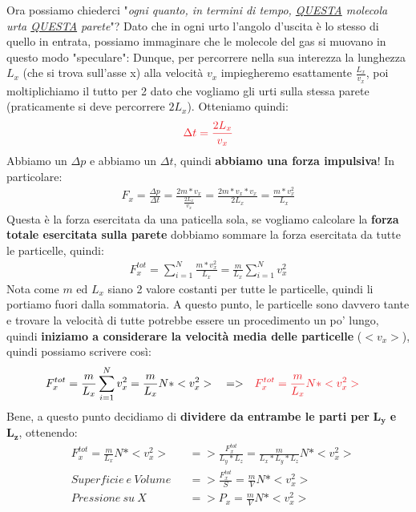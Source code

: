                     Ora possiamo chiederci "\textit{ogni quanto, in termini di tempo, \underline{QUESTA} molecola urta \underline{QUESTA} parete}"? Dato che in ogni urto l'angolo d'uscita è lo stesso di quello in entrata, possiamo immaginare che le molecole del gas si muovano in questo modo "speculare":
                    Dunque, per percorrere nella sua interezza la lunghezza $L_x$ (che si trova sull'asse x) alla velocità $v_x$ impiegheremo esattamente $\frac{L_x}{v_x}$, poi moltiplichiamo il tutto per 2 dato che vogliamo gli urti sulla stessa parete (praticamente si deve percorrere $2L_x$). Otteniamo quindi:
                    \begin{align*}
                        \textcolor{Red}{\Delta t = \frac{2L_x}{v_x}}
                    \end{align*}
                    Abbiamo un $\Delta p$ e abbiamo un $\Delta t$, quindi \textbf{abbiamo una forza impulsiva}! In particolare:
                    \begin{align*}
                        F_x=\frac{\Delta p}{\Delta t}= \frac{2m*v_{x}}{\frac{2L_x}{v_x}} = \frac{2m*v_{x}*v_{x}}{2L_x}= \frac{m*v_{x}^2}{L_x}
                    \end{align*}
                    Questa è la forza esercitata da una paticella sola, se vogliamo calcolare la \textbf{forza totale esercitata sulla parete} dobbiamo sommare la forza esercitata da tutte le particelle, quindi:
                    \begin{align*}
                        F_x^{tot}=\sum_{i=1}^N  \frac{m*v_{x}^2}{L_x}=  \frac{m}{L_x}\sum_{i=1}^Nv_{x}^2
                    \end{align*}
                    Nota come $m$ ed $L_x$ siano 2 valore costanti per tutte le particelle, quindi li portiamo fuori dalla sommatoria. A questo punto, le particelle sono davvero tante e trovare la velocità di tutte potrebbe essere un procedimento un po' lungo, quindi \textbf{iniziamo a considerare la velocità media delle particelle} ($<v_x>$), quindi possiamo scrivere così:
                    \begin{align*}
                        &F_x^{tot}=\frac{m}{L_x}\sum_{i=1}^Nv_{x}^2=\frac{m}{L_x}N*<v_{x}^2>&&=>&&\textcolor{Red}{F_x^{tot}=\frac{m}{L_x}N*<v_{x}^2>}
                    \end{align*}
                    Bene, a questo punto decidiamo di \textbf{dividere da entrambe le parti per} $\mathbf{L_y}$ \textbf{e} $\mathbf{L_z}$, ottenendo:
                    \begin{align*}
                        &F_x^{tot}=\frac{m}{L_x}N*<v_{x}^2> &&=>\frac{F_x^{tot}}{L_y*L_z}=\frac{m}{L_x*L_y*L_z}N*<v_{x}^2>\\
                        & Superficie\ e\ Volume&&=>\frac{F_x^{tot}}{S}=\frac{m}{V}N*<v_{x}^2>\\
                        &Pressione\ su\ X&&=>P_x=\frac{m}{V}N*<v_{x}^2>
                    \end{align*}
